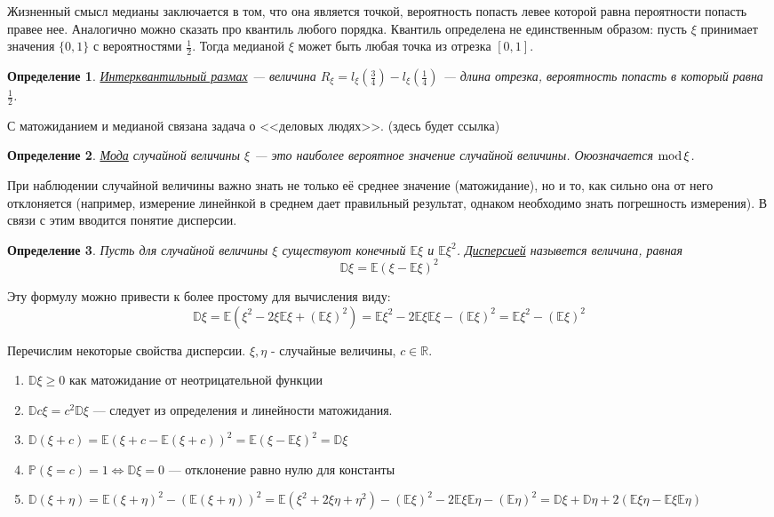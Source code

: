 \documentclass[12pt]{article}
\newtheorem{Def}{Определение}
\numberwithin{Th}{section}
\numberwithin{Def}{section}
\numberwithin{Lem}{section}
\numberwithin{St}{section}
\numberwithin{equation}{section}
\newcommand\Pro{\mathbb{P}} %
\newcommand\Real{\mathbb{R}} %
\newcommand\Expec{\mathbb{E}} %
\newcommand\Disp{\mathbb{D}}  %
\newcommand\Mod{{\rm mod \,}} %
\begin{document}
Жизненный смысл медианы заключается в том, что она является точкой, вероятность попасть левее которой равна пероятности попасть правее нее. Аналогично можно 
сказать про квантиль любого порядка. Квантиль определена не единственным образом: пусть $\xi$ принимает значения $\{0, 1\}$ с вероятностями $\frac12$. Тогда медианой
$\xi$ может быть любая точка из отрезка $[0,1]$.

\begin{Def}
\underline{Интерквантильный размах} --- величина $R_\xi = l_\xi(\frac34) - l_\xi(\frac14)$ --- длина отрезка, вероятность попасть в который равна $\frac12$. 
\end{Def}

С матожиданием и медианой связана задача о <<деловых людях>>. (здесь будет ссылка) 

\begin{Def}
\underline{Мода} случайной величины $\xi$ --- это наиболее вероятное значение случайной величины. Оюозначается $\Mod\xi$.
\end{Def}

При наблюдении случайной величины важно знать не только её среднее значение (матожидание), но и то, как сильно она от него отклоняется (например, измерение линейнкой в среднем дает правильный результат, однаком необходимо знать погрешность измерения). В связи с этим вводится понятие дисперсии.

\begin{Def}
Пусть для случайной величины $\xi$ существуют конечный $\Expec\xi$ и $\Expec\xi^2$.  \underline{Дисперсией} назывется величина, равная 
$$ \Disp\xi = \Expec(\xi - \Expec\xi)^2$$
\end{Def}

Эту формулу можно привести к более простому для вычисления виду:
$$\Disp\xi = \Expec(\xi^2 - 2\xi\Expec\xi + (\Expec\xi)^2) = \Expec\xi^2 - 2\Expec\xi\Expec\xi - (\Expec\xi)^2 = \Expec\xi^2 - (\Expec\xi)^2$$


Перечислим некоторые свойства дисперсии. $\xi,\eta$ - случайные величины, $c \in \Real$.

\begin{enumerate}
	\item $\Disp\xi \ge 0$ как матожидание от неотрицательной функции
	\item $\Disp c\xi = c^2 \Disp\xi$ --- следует из определения и линейности матожидания.
	\item $\Disp(\xi+c) = \Expec(\xi + c - \Expec(\xi + c))^2 = \Expec(\xi - \Expec\xi)^2 = \Disp\xi$
	\item $\Pro(\xi = c) = 1 \Leftrightarrow \Disp\xi = 0$ --- отклонение равно нулю для константы
	\item $\Disp(\xi + \eta) = \Expec(\xi+\eta)^2 - (\Expec(\xi+\eta))^2 = \Expec(\xi^2+2\xi\eta + \eta^2) - (\Expec\xi)^2- 2\Expec\xi\Expec\eta - (\Expec\eta)^2 = \Disp\xi + \Disp\eta + 2(\Expec\xi\eta - \Expec\xi\Expec\eta)$
\end{enumerate}
\end{document}
